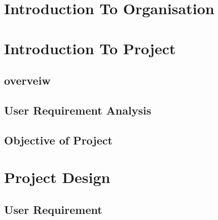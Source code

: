 \documentclass[12pt]{report}
\begin{document}

\begin{screen}
\ppttitle
\end{screen}
\footskip 0.7cm
\thispagestyle{empty} 
\pagetitle
\newpage
{}
\cfoot{\thepage}


\newpage




\newpage
\tableofcontents
\newpage
\listoffigures
\newpage

\cfoot{\thepage}

\newpage
\chapter{Introduction To Organisation}

\newpage
%
\chapter{Introduction To Project}

\section{overveiw}



\section{User Requirement Analysis} 




\section{Objective of Project}

\chapter{Project Design}

\section{User Requirement}

\end{document}
